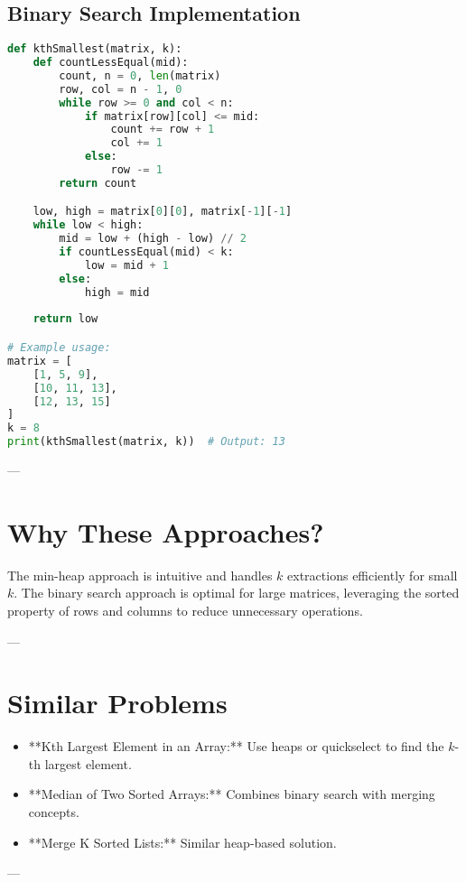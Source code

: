\subsection*{Binary Search Implementation}
\begin{fullwidth}
\begin{lstlisting}[language=Python]
def kthSmallest(matrix, k):
    def countLessEqual(mid):
        count, n = 0, len(matrix)
        row, col = n - 1, 0
        while row >= 0 and col < n:
            if matrix[row][col] <= mid:
                count += row + 1
                col += 1
            else:
                row -= 1
        return count

    low, high = matrix[0][0], matrix[-1][-1]
    while low < high:
        mid = low + (high - low) // 2
        if countLessEqual(mid) < k:
            low = mid + 1
        else:
            high = mid
    
    return low

# Example usage:
matrix = [
    [1, 5, 9],
    [10, 11, 13],
    [12, 13, 15]
]
k = 8
print(kthSmallest(matrix, k))  # Output: 13
\end{lstlisting}
\end{fullwidth}

---

\section*{Why These Approaches?}
The min-heap approach is intuitive and handles \(k\) extractions efficiently for small \(k\). The binary search approach is optimal for large matrices, leveraging the sorted property of rows and columns to reduce unnecessary operations.

---

\section*{Similar Problems}
\begin{itemize}
    \item **Kth Largest Element in an Array:** Use heaps or quickselect to find the \(k\)-th largest element.
    \item **Median of Two Sorted Arrays:** Combines binary search with merging concepts.
    \item **Merge K Sorted Lists:** Similar heap-based solution.
\end{itemize}

---

